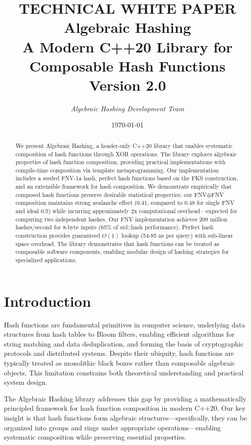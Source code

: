 \documentclass[11pt,a4paper]{article}
\title{
    \vspace{-2cm}
    \Large \textbf{TECHNICAL WHITE PAPER} \\
    \vspace{0.5cm}
    \Huge \textbf{Algebraic Hashing} \\
    \vspace{0.3cm}
    \Large A Modern C++20 Library for Composable Hash Functions \\
    \vspace{0.5cm}
    \large Version 2.0
}
\author{
    \textit{Algebraic Hashing Development Team} \\
    \vspace{0.2cm}
}
\date{\today}
\theoremstyle{definition}
\begin{document}
\maketitle
\thispagestyle{empty}

\vfill

\begin{abstract}
\noindent
We present Algebraic Hashing, a header-only C++20 library that enables systematic composition of hash functions through XOR operations. The library explores algebraic properties of hash function composition, providing practical implementations with compile-time composition via template metaprogramming. Our implementation includes a seeded FNV-1a hash, perfect hash functions based on the FKS construction, and an extensible framework for hash composition. We demonstrate empirically that composed hash functions preserve desirable statistical properties: our FNV$\oplus$FNV composition maintains strong avalanche effect (0.41, compared to 0.48 for single FNV and ideal 0.5) while incurring approximately 2x computational overhead—expected for computing two independent hashes. Our FNV implementation achieves 209 million hashes/second for 8-byte inputs (65\% of std::hash performance). Perfect hash construction provides guaranteed $O(1)$ lookup (54-85 ns per query) with sub-linear space overhead. The library demonstrates that hash functions can be treated as composable software components, enabling modular design of hashing strategies for specialized applications.
\end{abstract}

\newpage
\tableofcontents
\newpage

\section{Introduction}

Hash functions are fundamental primitives in computer science, underlying data structures from hash tables to Bloom filters, enabling efficient algorithms for string matching and data deduplication, and forming the basis of cryptographic protocols and distributed systems. Despite their ubiquity, hash functions are typically treated as monolithic black boxes rather than composable algebraic objects. This limitation constrains both theoretical understanding and practical system design.

The Algebraic Hashing library addresses this gap by providing a mathematically principled framework for hash function composition in modern C++20. Our key insight is that hash functions form algebraic structures—specifically, they can be organized into groups and rings under appropriate operations—enabling systematic composition while preserving essential properties.
\end{document}

